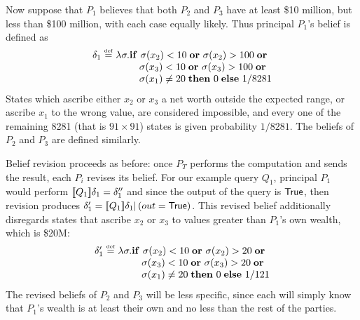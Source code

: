 \documentclass[10pt]{sigplanconf}
\begin{document}
Now suppose that $P_1$ believes that both $P_2$ and $P_3$ have at
least \$10 million, but less than \$100 million, with each case
equally likely.  Thus principal $P_1$'s belief is defined as
$$\begin{array}{l@{}l}
\delta_1 \defeq \lambda \sigma. & \aif \sigma(x_2) < 10\; \aor \sigma(x_2) >
  100\; \aor \\
& \quad \sigma(x_3) < 10\; \aor \sigma(x_3) > 100\; \aor \\
& \quad \sigma(x_1) \not= 20\;\athen 0\; \aelse 1/8281
\end{array}
$$
States which ascribe either $x_2$ or $x_3$ a net worth outside
the expected range, or ascribe $x_1$ to the wrong value, are
considered impossible, and every one of the
remaining 8281 (that is $91 \times 91$) states is given probability
$1/8281$.  The beliefs of $P_2$ and $P_3$ are defined similarly.


Belief revision proceeds as before: once $P_T$ performs the
computation and sends the result, each $P_i$ revises its belief.  For
our example query $Q_1$, principal $P_1$ would perform
$[\![{Q_1}]\!]{\delta_1} = \delta_1''$ and since the output of the
query is $\mathsf{True}$, then revision produces $\delta_1' =
[\![{Q_1}]\!]{\delta_1} | \left( out = \mathsf{True} \right) $.  This revised
belief additionally disregards states that ascribe $x_2$ or $x_3$ to
values greater than $P_1$'s own wealth, which is \$20M:
$$\begin{array}{l@{}l}
\delta_1' \defeq \lambda \sigma. & \aif \sigma(x_2) < 10\; \aor \sigma(x_2) >
  20\; \aor \\
& \quad\sigma(x_3) < 10\; \aor \sigma(x_3) > 20\; \aor \\
& \quad \sigma(x_1) \not= 20\;\athen 0\; \aelse 1/121
\end{array}
$$
The revised beliefs of $P_2$ and $P_3$ will be less specific, since
each will simply know that $P_1$'s wealth is at least their own and no
less than the rest of the parties.
\end{document}
